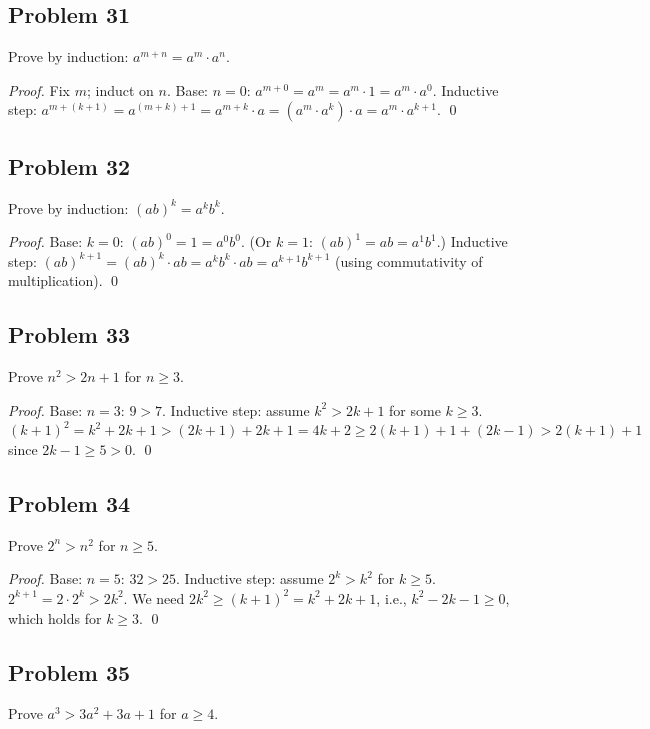 \subsection*{Problem 31}
Prove by induction: $a^{m+n} = a^m \cdot a^n$.

\textit{Proof.} Fix $m$; induct on $n$. Base: $n=0$: $a^{m+0} = a^m = a^m \cdot 1 = a^m \cdot a^0$.
Inductive step: $a^{m+(k+1)} = a^{(m+k)+1} = a^{m+k} \cdot a = (a^m \cdot a^k) \cdot a = a^m \cdot a^{k+1}$. \qed

\subsection*{Problem 32}
Prove by induction: $(ab)^k = a^k b^k$.

\textit{Proof.} Base: $k=0$: $(ab)^0 = 1 = a^0 b^0$. (Or $k=1$: $(ab)^1 = ab = a^1 b^1$.)
Inductive step: $(ab)^{k+1} = (ab)^k \cdot ab = a^k b^k \cdot ab = a^{k+1} b^{k+1}$ (using commutativity of multiplication). \qed

\subsection*{Problem 33}
Prove $n^2 > 2n + 1$ for $n \ge 3$.

\textit{Proof.} Base: $n=3$: $9 > 7$. Inductive step: assume $k^2 > 2k+1$ for some $k \ge 3$.
$(k+1)^2 = k^2 + 2k + 1 > (2k+1) + 2k + 1 = 4k + 2 \ge 2(k+1) + 1 + (2k-1) > 2(k+1)+1$
since $2k - 1 \ge 5 > 0$. \qed

\subsection*{Problem 34}
Prove $2^n > n^2$ for $n \ge 5$.

\textit{Proof.} Base: $n=5$: $32 > 25$. Inductive step: assume $2^k > k^2$ for $k \ge 5$.
$2^{k+1} = 2 \cdot 2^k > 2k^2$. We need $2k^2 \ge (k+1)^2 = k^2 + 2k + 1$, i.e., $k^2 - 2k - 1 \ge 0$, which holds for $k \ge 3$. \qed

\subsection*{Problem 35}
Prove $a^3 > 3a^2 + 3a + 1$ for $a \ge 4$.

